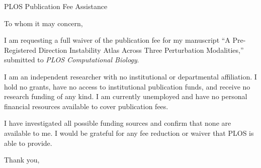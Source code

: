 \documentclass[11pt]{letter}
\date{July 10, 2026}
\begin{document}
\begin{letter}{PLOS Publication Fee Assistance}

\opening{To whom it may concern,}

I am requesting a full waiver of the publication fee for my manuscript
``A Pre-Registered Direction Instability Atlas Across Three Perturbation
Modalities,'' submitted to \textit{PLOS Computational Biology}.

I am an independent researcher with no institutional or departmental
affiliation.  I hold no grants, have no access to institutional
publication funds, and receive no research funding of any kind.  I am
currently unemployed and have no personal financial resources available
to cover publication fees.

I have investigated all possible funding sources and confirm that none
are available to me.  I would be grateful for any fee reduction or
waiver that PLOS is able to provide.

\closing{Thank you,}

\end{letter}
\end{document}
